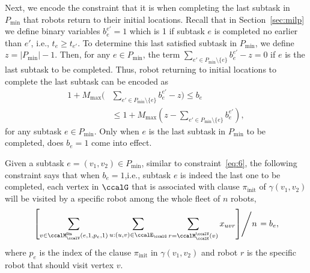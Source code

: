 \documentclass[Afour,sageh,times]{sagej}
\begin{document}
{{Next, we encode the constraint that it is when completing the last subtask in $P_{\text{min}}$ that robots return to their initial locations. Recall that in Section~\ref{sec:milp} we define binary variables $b_{e}^{e'}=1$ which is 1 if subtask $e$ is completed no earlier than $e'$, i.e., $t_e \geq t_{e'}$. To determine this last satisfied subtask in $P_{\text{min}}$, %
  we define $z = |P_{\text{min}}| -1$. Then, for any $e \in P_{\text{min}}$, the term $\sum_{e' \in  P_{\text{min}}\setminus \{e \} } b_{e}^{e'} - z  = 0$ if $e$ is the last subtask to be completed. Thus, robot returning to initial locations to complete the last subtask  can be encoded as
\begin{align}
  1 + M_{\text{max}} ( &  \sum_{e' \in  P_{\text{min}}\setminus \{e \} } b_{e}^{e'} - z)  \leq  b_e \nonumber \\
  & \leq 1 + M_{\text{max}} (z - \sum_{e' \in  P_{\text{min}}\setminus \{e \} } b_{e}^{e'}),
\end{align}
for any subtask $e \in P_{\text{min}}$. Only when $e$ is the last subtask in $P_{\text{min}}$ to be completed, does $b_e = 1$ come into effect.


Given a subtask $e = (v_1, v_2) \in P_{\text{min}}$, similar to constraint~\eqref{eq:6}, the following constraint says that when $b_e=1$,i.e., subtask $e$ is indeed the last one to be completed,  each vertex in $\ccalG$ that is associated with clause $\pi_{\text{init}}$ of $\gamma(v_1, v_2)$ will be visited by a specific robot among the whole fleet of $n$ robots,
\begin{align}\label{eq:return_suffix}
  \left.   \left[ \sum_{v \in \ccalM_\ccalV^\mathsf{lits}(e, 1, p_e, 1)}   \sum_{u: (u,v) \in \ccalE_\ccalG}     \sum_{r = \ccalM_{\ccalK}^\ccalV(v) }   x_{uvr} \right] \middle/ {n} \right. = b_e,
 \end{align}
where $p_e$ is the index of the clause $\pi_{\text{init}}$ in $\gamma(v_1, v_2)$ and robot $r$ is the specific robot that should visit vertex $v$.

}}
\end{document}
